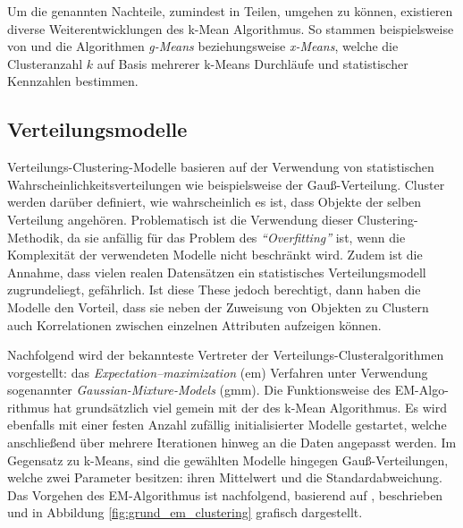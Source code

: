 Um die genannten Nachteile, zumindest in Teilen, umgehen zu können, existieren diverse Weiterentwicklungen des k-Mean
Algorithmus. So stammen beispielsweise von \cite[]{Hamerly} und \cite[]{Pelleg} die Algorithmen \textit{g-Means}
beziehungsweise \textit{x-Means}, welche die Clusteranzahl $k$ auf Basis mehrerer k-Means Durchläufe und
statistischer Kennzahlen bestimmen.

\subsection{Verteilungsmodelle}
\label{sec:grund_distribution_clustering}

Verteilungs-Clustering-Modelle basieren auf der Verwendung von statistischen Wahrscheinlichkeitsverteilungen wie
beispielsweise der Gauß-Verteilung. Cluster werden darüber definiert, wie wahrscheinlich es ist, dass Objekte
der selben Verteilung angehören. Problematisch ist die Verwendung dieser Clustering-Methodik, da sie anfällig für
das Problem des \textit{``Overfitting''} ist, wenn die Komplexität der verwendeten Modelle nicht beschränkt wird.
Zudem ist die Annahme, dass vielen realen Datensätzen ein statistisches Verteilungsmodell zugrundeliegt, gefährlich.
Ist diese These jedoch berechtigt, dann haben die Modelle den Vorteil, dass sie neben der Zuweisung von Objekten zu Clustern
auch Korrelationen zwischen einzelnen Attributen aufzeigen können. \cite[]{AndersDrachen2014}

Nachfolgend wird der bekannteste Vertreter der Verteilungs-Clusteralgorithmen vorgestellt:
das \textit{Expectation–maximization} (\acrshort*{em}) Verfahren unter Verwendung sogenannter \textit{Gaussian-Mixture-Models} (\acrshort*{gmm}).
Die Funktionsweise des EM-Algo-rithmus hat grundsätzlich viel gemein mit der des k-Mean Algorithmus.
Es wird ebenfalls mit einer festen Anzahl zufällig initialisierter Modelle gestartet, welche anschließend über mehrere Iterationen
hinweg an die Daten angepasst werden. Im Gegensatz zu k-Means, sind die gewählten Modelle hingegen Gauß-Verteilungen,
welche zwei Parameter besitzen: ihren Mittelwert und die Standardabweichung.
Das Vorgehen des EM-Algorithmus ist nachfolgend, basierend auf \cite[]{GeorgeSeif2018}, beschrieben und in
Abbildung \ref{fig:grund_em_clustering} grafisch dargestellt.

